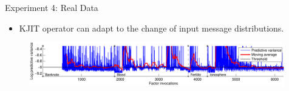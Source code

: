 \documentclass[english]{beamer}
\begin{document}
\begin{frame}
\begin{columns}[t]
\begin{block}{ Experiment 4: Real Data}
\begin{figure}[ht]
  \centering
  \hspace{5mm}
  \hspace{5mm}
  \label{fig:uci_performance}
\end{figure}

\begin{itemize}
    \item KJIT operator can adapt to the change of input message distributions.
\end{itemize}

\begin{figure}
\centering
\includegraphics[width=0.99\textwidth]{online/uci_temporal_uncertainty-crop}
\end{figure}

\end{block}




\end{columns}
\end{frame}
\end{document}
